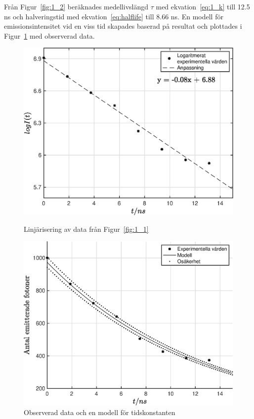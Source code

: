 Från Figur~\ref{fig:1_2} beräknades medellivslängd $\tau$ med ekvation~\ref{eq:1_k} till 12.5 ns och halveringstid med ekvation~\ref{eq:halflife} till 8.66 ns. En modell för emissionsintensitet vid en viss tid skapades baserad på resultat och plottades i Figur~\ref{fig:1_3} med observerad data.
\begin{figure}[H]
        \includegraphics[width=\linewidth]{Resources/Graphics/fig1_2.eps}
        \caption{Linjärisering av data från Figur~\ref{fig:1_1}}\label{fig:1_2}
    \endminipage\hfill
        \includegraphics[width=\linewidth]{Resources/Graphics/fig1_3.eps}
        \caption{Observerad data och en modell för tidskonstanten}\label{fig:1_3}
    \endminipage
\end{figure}

